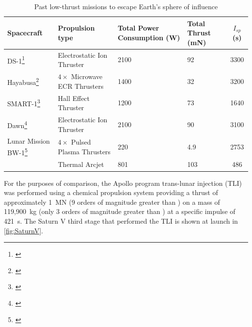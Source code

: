 \begin{table}[ht]
\caption{Past low-thrust missions to escape Earth's sphere of influence}
\label{tab:Past-low-thrust-missions}
\centering
\begin{minipage}{\textwidth}
\begin{tabular}{C{0.2\textwidth} C{0.25\textwidth} C{0.2\textwidth} C{0.1\textwidth} c}\toprule
  Spacecraft & Propulsion type & Total Power \linebreak Consumption \linebreak (W) & Total Thrust \linebreak (mN) & $I_{sp}$ (s)\\\midrule
  DS-1\footnote{\textcite{web_DS-1}} & Electrostatic Ion Thruster & 2100 & 92 & 3300\\
  Hayabusa\footnote{\textcite{web_Hayabusa}} & $4\times$ Microwave ECR Thrusters & 1400 & 32 & 3200\\
  SMART-1\footnote{\textcite{web_SMART-1}} & Hall Effect Thruster & 1200 & 73 & 1640\\
  Dawn\footnote{\textcite{web_Dawn}} & Electrostatic Ion Thruster & 2100 & 90 & 3100\\\midrule
  Lunar Mission BW-1\footnote{\textcite{web_BW-1}} & $4\times$ Pulsed Plasma Thrusters & 220 & 4.9 & 2753\\
  & Thermal Arcjet & 801 & 103 & 486 \\\bottomrule
\end{tabular}
\end{minipage}
\end{table}

For the purposes of comparison, the Apollo program trans-lunar injection (TLI) was performed using a chemical propulsion system providing a thrust of approximately 1~MN (9 orders of magnitude greater than \BW) on a mass of 119,900~kg (only 3 orders of magnitude greater than \BW) at a specific impulse of 421~s. The Saturn V third stage that performed the TLI is shown at launch in \autoref{fig:SaturnV}.

